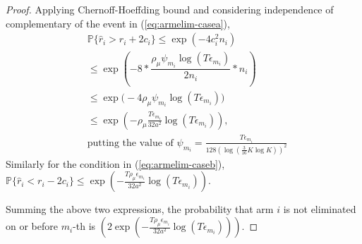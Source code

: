 \begin{proof}
Applying Chernoff-Hoeffding bound and considering independence of complementary of the event in (\ref{eq:armelim-casea}),
\begin{align*}
&\mathbb{P}\lbrace\hat{r}_{i}> r_{i} + 2c_{i}\rbrace \leq \exp(-4 c_{i}^{2}n_{i})\\
&\leq \exp(-8 * \dfrac{\rho_{\mu}\psi_{m_i}\log ( T\epsilon_{m_{i}})}{2 n_{i}} *n_{i})\\
&\leq \exp\big(-4\rho_{\mu}\psi_{m_i}\log ( T\epsilon_{m_{i}})\big)\\
&\leq \exp\left(-\rho_{\mu}\frac{T\epsilon_{m_{i}}}{32 a^2}\log ( T\epsilon_{m_{i}})\right),\\
&\text{putting the value of $\psi_{m_i}=\frac{T\epsilon_{m_i}}{128(\log(\frac{3}{16} K\log K))^{2}}$}
\end{align*}
Similarly for the condition in (\ref{eq:armelim-caseb}), $\mathbb{P}\lbrace\hat{r}_{i}< r_{i} - 2c_{i}\rbrace\leq \exp\left(-\frac{T\rho_{\mu}\epsilon_{m_{i}}}{32 a^2 }\log ( T\epsilon_{m_{i}})\right)$.

Summing the above two expressions, the probability that arm ${i}$ is not eliminated on or before $m_{i}$-th is $\left(2\exp\left(-\frac{T\rho_{\mu}\epsilon_{m_{i}}}{32 a^2 }\log ( T\epsilon_{m_{i}})\right)\right)$. 



\end{proof}

